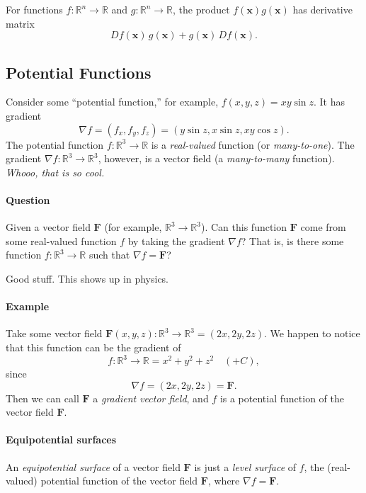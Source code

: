 \documentclass[11pt]{article}
\renewcommand{\vec}[1]{\mathbf{#1}}
\begin{document}
For functions \(f \colon \mathbb R^n \to \mathbb R\) and \(g \colon \mathbb R^n \to \mathbb R\), the product \(f(\vec x) g(\vec x)\) has derivative matrix
\[
    Df(\vec x) \, g(\vec x) + g(\vec x) \, Df(\vec x).
\]

\subsection*{Potential Functions}

Consider some ``potential function,'' for example, \(f(x, y, z) = xy \sin z\). It has gradient
\[
    \nabla f = (f_x, f_y, f_z) = (y \sin z, x \sin z, x y \cos z).
\]
The potential function \(f \colon \mathbb R^3 \to \mathbb R\) is a \emph{real-valued} function (or \emph{many-to-one}). The gradient \(\nabla f \colon \mathbb R^3 \to \mathbb R^3\), however, is a vector field (a \emph{many-to-many} function). \emph{Whooo, that is so cool.}

\paragraph{Question}

Given a vector field \(\vec F\) (for example, \(\mathbb R^3 \to \mathbb R^3\)). Can this function \(\vec F\) come from some real-valued function \(f\) by taking the gradient \(\nabla f\)? That is, is there some function \(f \colon \mathbb R^3 \to \mathbb R\) such that \(\nabla f = \vec F\)?

Good stuff. This shows up in physics. 

\paragraph{Example}

Take some vector field \(\vec F(x, y, z) \colon \mathbb R^3 \to \mathbb R^3 = (2x, 2y, 2z)\). We happen to notice that this function can be the gradient of 
\[
    f\colon \mathbb R^3 \to \mathbb R = x^2 + y^2 + z^2 \quad (+C),
\]
since
\[
    \nabla f = (2x, 2y, 2z) = \vec F.
\]
Then we can call \(\vec F\) a \emph{gradient vector field}, and \(f\) is a potential function of the vector field \(\vec F\).

\paragraph{Equipotential surfaces}

An \emph{equipotential surface} of a vector field \(\vec F\) is just a \emph{level surface} of \(f\), the (real-valued) potential function of the vector field \(\vec F\), where \(\nabla f = \vec F\).
\end{document}
